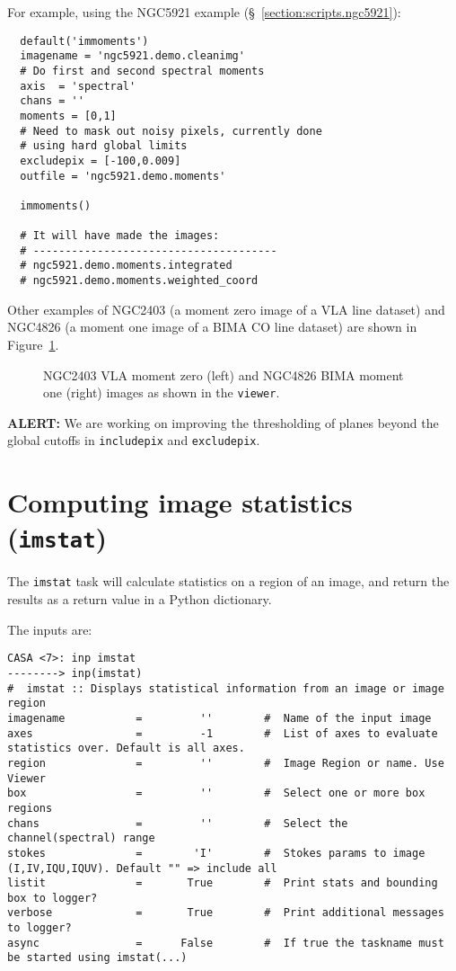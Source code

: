 For example, using the NGC5921 example (\S~\ref{section:scripts.ngc5921}):
\small
\begin{verbatim}
  default('immoments')
  imagename = 'ngc5921.demo.cleanimg'
  # Do first and second spectral moments
  axis  = 'spectral'
  chans = ''
  moments = [0,1]
  # Need to mask out noisy pixels, currently done
  # using hard global limits
  excludepix = [-100,0.009]
  outfile = 'ngc5921.demo.moments'
  
  immoments()
  
  # It will have made the images:
  # --------------------------------------
  # ngc5921.demo.moments.integrated
  # ngc5921.demo.moments.weighted_coord
\end{verbatim}
\normalsize

Other examples of NGC2403 (a moment zero image of a VLA line dataset)
and NGC4826 (a moment one image of a BIMA CO line dataset) are
shown in Figure~\ref{fig:n2403momzero}.

\begin{figure}[h!]
\begin{center}
\caption{\label{fig:n2403momzero} NGC2403 VLA moment zero (left) and
NGC4826 BIMA moment one (right) images as shown in the {\tt viewer}.}
\hrulefill
\end{center}
\end{figure}

{\bf ALERT:} We are working on improving the thresholding
of planes beyond the global cutoffs in {\tt includepix}
and {\tt excludepix}.

\section{Computing image statistics ({\tt imstat})}
\label{section:analysis.imstat}

The {\tt imstat} task will calculate statistics on a region of
an image, and return the results as a return value in a Python
dictionary.

The inputs are:
\small
\begin{verbatim}
CASA <7>: inp imstat
--------> inp(imstat)
#  imstat :: Displays statistical information from an image or image region
imagename           =         ''        #  Name of the input image
axes                =         -1        #  List of axes to evaluate statistics over. Default is all axes.
region              =         ''        #  Image Region or name. Use Viewer
box                 =         ''        #  Select one or more box regions
chans               =         ''        #  Select the channel(spectral) range
stokes              =        'I'        #  Stokes params to image (I,IV,IQU,IQUV). Default "" => include all
listit              =       True        #  Print stats and bounding box to logger?
verbose             =       True        #  Print additional messages to logger?
async               =      False        #  If true the taskname must be started using imstat(...)
\end{verbatim}
\normalsize

